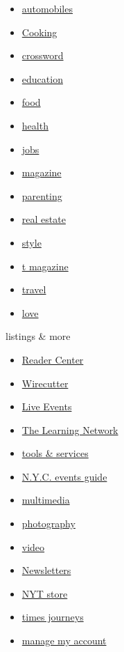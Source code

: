 \begin{itemize}
\tightlist
\item
  \href{https://www.nytimes.com/section/automobiles}{automobiles}
\item
  \href{https://cooking.nytimes.com/}{Cooking}
\item
  \href{https://www.nytimes.com/crosswords}{crossword}
\item
  \href{https://www.nytimes.com/section/education}{education}
\item
  \href{https://www.nytimes.com/section/food}{food}
\item
  \href{https://www.nytimes.com/section/health}{health}
\item
  \href{https://www.nytimes.com/section/jobs}{jobs}
\item
  \href{https://www.nytimes.com/section/magazine}{magazine}
\item
  \href{https://parenting.nytimes.com/}{parenting}
\item
  \href{https://www.nytimes.com/section/realestate}{real estate}
\item
  \href{https://www.nytimes.com/section/style}{style}
\item
  \href{https://www.nytimes.com/section/t-magazine}{t magazine}
\item
  \href{https://www.nytimes.com/section/travel}{travel}
\item
  \href{https://www.nytimes.com/section/fashion/weddings}{love}
\end{itemize}

listings \& more

\begin{itemize}
\tightlist
\item
  \href{https://www.nytimes.com/section/reader-center}{Reader Center}
\item
  \href{https://thewirecutter.com}{Wirecutter}
\item
  \href{http://nytconferences.com/}{Live Events}
\item
  \href{https://www.nytimes.com/section/learning}{The Learning Network}
\item
  \href{http://www.nytimes.com/marketing/tools-and-services}{tools \&
  services}
\item
  \href{https://www.nytimes.com/spotlight/arts-listings}{N.Y.C. events
  guide}
\item
  \href{https://www.nytimes.com/section/multimedia}{multimedia}
\item
  \href{https://www.nytimes.com/section/lens}{photography}
\item
  \href{https://www.nytimes.com/video}{video}
\item
  \href{https://www.nytimes.com/newsletters}{Newsletters}
\item
  \href{https://store.nytimes.com/}{NYT store}
\item
  \href{https://www.nytimes.com/times-journeys}{times journeys}
\item
  \href{https://account.nytimes.com/}{manage my account}
\end{itemize}

